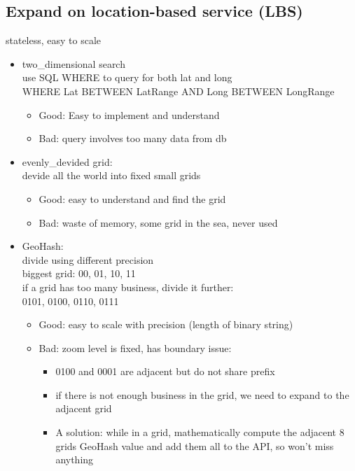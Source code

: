 \documentclass{article}
\begin{document}
\subsection{Expand on location-based service (LBS)}
stateless, easy to scale\\
\begin{itemize}
    \item two\_dimensional search\\
    use SQL WHERE to query for both lat and long\\
    WHERE Lat BETWEEN LatRange AND Long BETWEEN LongRange\\
    \begin{itemize}
        \item Good: Easy to implement and understand
        \item Bad: query involves too many data from db
    \end{itemize}
    \item evenly\_devided grid:\\
    devide all the world into fixed small grids\\
    \begin{itemize}
        \item Good: easy to understand and find the grid
        \item Bad: waste of memory, some grid in the sea, never used
    \end{itemize}
    \item GeoHash:\\
    divide using different precision\\
    biggest grid: 00, 01, 10, 11\\
    if a grid has too many business, divide it further:\\
    0101, 0100, 0110, 0111\\
    \begin{itemize}
        \item Good: easy to scale with precision (length of binary string)
        \item Bad: zoom level is fixed, has boundary issue:\\
        \begin{itemize}
            \item 0100 and 0001 are adjacent but do not share prefix
            \item if there is not enough business in the grid, we need to expand to the adjacent grid
            \item A solution: while in a grid, mathematically compute the adjacent 8 grids GeoHash value and add them all to the API, so won't miss anything

\end{itemize}
\end{itemize}
\end{itemize}
\end{document}
